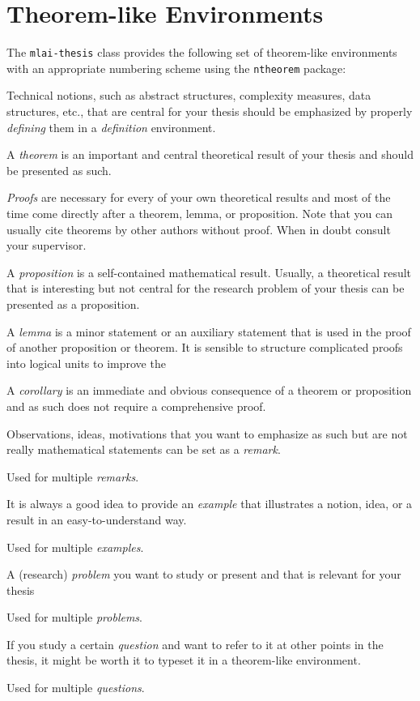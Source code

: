 \section{Theorem-like Environments} \label{sec:theorem-like-environments} 

The \texttt{mlai-thesis} class provides the following set of theorem-like environments with an appropriate numbering scheme using the \texttt{ntheorem} package: 
\begin{description}[font=\normalfont\ttfamily]
	\item[defn] Technical notions, such as abstract structures, complexity measures, data structures, etc., that are central for your thesis should be emphasized by properly \emph{defining} them in a \emph{definition} environment. 
	\item[thm] A \emph{theorem} is an important and central theoretical result of your thesis and should be presented as such. 
	\item[proof] \emph{Proofs} are necessary for every of your own theoretical results and most of the time come directly after a theorem, lemma, or proposition. Note that you can usually cite theorems by other authors without proof. When in doubt consult your supervisor. 
	\item[prop] A \emph{proposition} is a self-contained mathematical result. Usually, a theoretical result that is interesting but not central for the research problem of your thesis can be presented as a proposition. 
	\item[lem] A \emph{lemma} is a minor statement or an auxiliary statement that is used in the proof of another proposition or theorem. It is sensible to structure complicated proofs into logical units to improve the 
	\item[cor] A \emph{corollary} is an immediate and obvious consequence of a theorem or proposition and as such does not require a comprehensive proof. 
	\item[rmk] Observations, ideas, motivations that you want to emphasize as such but are not really mathematical statements can be set as a \emph{remark}. 
	\item[rmks] Used for multiple \emph{remarks}. 
	\item[exa] It is always a good idea to provide an \emph{example} that illustrates a notion, idea, or a result in an easy-to-understand way. 
	\item[exas] Used for multiple \emph{examples}. 
	\item[prblm] A (research) \emph{problem} you want to study or present and that is relevant for your thesis
	\item[prblms] Used for multiple \emph{problems}. 
	\item[quest] If you study a certain \emph{question} and want to refer to it at other points in the thesis, it might be worth it to typeset it in a theorem-like environment. 
	\item[quests] Used for multiple \emph{questions}. 
\end{description}

